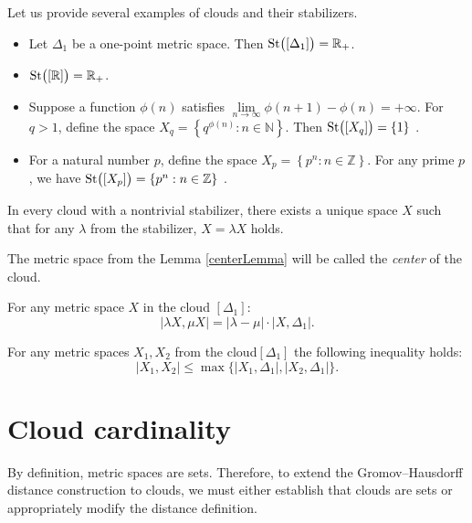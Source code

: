 \documentclass[leqno]{article}
\begin{document}
Let us provide several examples of clouds and their stabilizers.

\begin{itemize}
  \item Let $\Delta_1$ be a one-point metric space. Then
    $\operatorname{St}\bigl([\Delta_1]\bigr) = \mathbb{R}_+$.
  \item $\operatorname{St}\bigl([\mathbb{R}]\bigr) = \mathbb{R}_+$.
  \item Suppose a function $\phi(n)$ satisfies $\lim\limits_{n
    \rightarrow \infty} \phi(n + 1) - \phi(n) = +\infty$. For $q >
    1$, define the space $X_q = \left\{q^{\phi(n)}: n \in
    \mathbb{N}\right\}$. Then $\operatorname{St}\bigl([X_q]\bigr) = \{1\}$ \cite{TuzhBog1}.
  \item For a natural number $p$, define the space $X_p = \left\{p^n
    : n \in \mathbb{Z}\right\}$. For any prime $p$, we have
    $\operatorname{St}\bigl([X_p]\bigr) = \left\{p^n : n \in \mathbb{Z}\right\}$
    \cite{BogBog1}.
\end{itemize}

\begin{lemma}
  In every cloud with a nontrivial stabilizer, there exists a unique
  space $X$ such that for any $\lambda$ from the stabilizer, $X =
  \lambda X$ holds.
  \label{centerLemma}
\end{lemma}

\begin{defin}
  The metric space from the Lemma \ref{centerLemma} will be called
  the \emph{center} of the cloud.
\end{defin}
\begin{remark} For any metric space $X$ in the cloud $[\Delta_1]$:
  $$|\lambda X, \mu X| = |\lambda - \mu|\cdot|X,\Delta_1|.$$
\end{remark}
\begin{remark} For any metric spaces $X_{1},
  X_{2}$ from the cloud$[\Delta_{1}]$ the following inequality holds:
  $$|X_{1},X_{2}| \le \max\{|X_{1}, \Delta_{1}|,|X_{2},\Delta_{1}|\}.$$
  \label{remUltraMetric}
\end{remark}
\section{Cloud cardinality}

By definition, metric spaces are sets. Therefore, to extend the
Gromov--Hausdorff distance construction to clouds, we must either
establish that clouds are sets or appropriately modify the distance definition.
\end{document}
